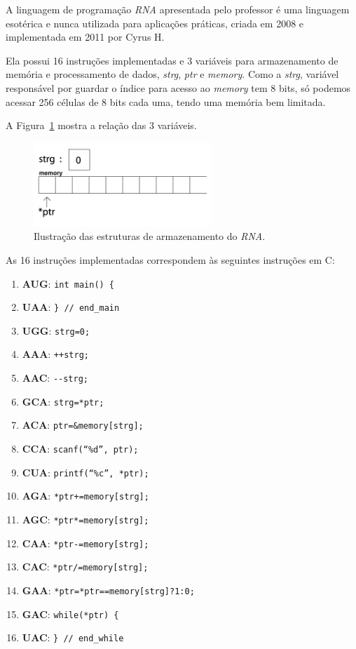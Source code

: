 
A linguagem de programação \emph{RNA} apresentada pelo professor é uma linguagem esotérica e nunca utilizada para aplicações práticas, criada em 2008 e implementada em 2011 por Cyrus H.  

Ela possui 16 instruções implementadas e 3 variáveis para armazenamento de memória e processamento de dados, \emph{strg}, \emph{ptr} e \emph{memory}. Como a \emph{strg}, variável responsável por guardar o índice para acesso ao \emph{memory} tem 8 bits, só podemos acessar 256 células de 8 bits cada uma, tendo uma memória bem limitada.

A Figura~\ref{fig:expl-rna} mostra a relação das 3 variáveis.

\begin{figure}[htbp]
    \centering
    \includegraphics[width=0.6\textwidth]{./images/expl-rna.png}
    \caption{Ilustração das estruturas de armazenamento do \emph{RNA}.}
    \label{fig:expl-rna}
\end{figure}

As 16 instruções implementadas correspondem às seguintes instruções em C:

\begin{enumerate}
	\item \textbf{AUG}: \verb$int main() {$
	\item \textbf{UAA}: \verb$} // end_main$
	\item \textbf{UGG}: \verb$strg=0;$
	\item \textbf{AAA}: \verb$++strg;$
	\item \textbf{AAC}: \verb$--strg;$
	\item \textbf{GCA}: \verb$strg=*ptr;$
	\item \textbf{ACA}: \verb$ptr=&memory[strg];$
	\item \textbf{CCA}: \verb$scanf(“%d”, ptr);$
	\item \textbf{CUA}: \verb$printf(“%c”, *ptr);$
	\item \textbf{AGA}: \verb$*ptr+=memory[strg];$
	\item \textbf{AGC}: \verb$*ptr*=memory[strg];$
	\item \textbf{CAA}: \verb$*ptr-=memory[strg];$
	\item \textbf{CAC}: \verb$*ptr/=memory[strg];$
	\item \textbf{GAA}: \verb$*ptr=*ptr==memory[strg]?1:0;$
	\item \textbf{GAC}: \verb$while(*ptr) {$
	\item \textbf{UAC}: \verb$} // end_while$
\end{enumerate}

